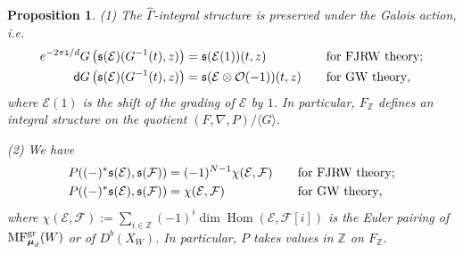 \documentclass[11pt]{amsart}
\newtheorem{pro}[thm]{Proposition} %
\theoremstyle{definition} %
\theoremstyle{remark} %
\newcommand{\ZZ}{\mathbb Z}
\newcommand{\Hom}{\operatorname{Hom}}
\def\MFhom{\operatorname{{MF}}}
\newcommand{\bmu}{\boldsymbol{\mu}}
\newcommand{\cO}{\mathcal{O}}
\newcommand{\cE}{\mathcal{E}}
\newcommand{\cF}{\mathcal{F}}
\newcommand{\frs}{\mathfrak{s}}
\newcommand{\dd}{\mathsf{d}}
\newcommand{\hGamma}{\widehat{\Gamma}}
\newcommand{\iu}{\mathtt{i}}
\begin{document}
\begin{pro} 
\label{pro:Gamma-intstr-properties}
{\rm (1)} The $\hGamma$-integral structure is preserved under 
the Galois action, i.e.\ 
\begin{alignat*}{2}
e^{-2\pi\iu/d} G \left( \frs(\cE)(G^{-1}(t),z) \right) 
& = \frs(\cE(1))(t,z)  
& & \text{\rm for FJRW theory}; \\ 
\dd G \left( \frs(\cE)(G^{-1}(t), z) \right) & = 
\frs(\cE\otimes \cO(-1))(t,z) \quad 
& & \text{\rm for GW theory},   
\end{alignat*} 
where $\cE(1)$ is the shift of the grading of $\cE$ by $1$. 
In particular, $F_\ZZ$ defines an integral structure 
on the quotient $(F,\nabla,P)/\langle G \rangle$. 

{\rm (2)} We have 
\begin{alignat*}{2} 
P((-)^*\frs(\cE), \frs(\cF)) & = (-1)^{N-1} \chi(\cE,\cF)  
& \quad & \text{\rm for FJRW theory;}\\ 
P((-)^*\frs(\cE),\frs(\cF)) & = \chi(\cE,\cF) 
& & \text{\rm for GW theory}, 
\end{alignat*} 
where $\chi(\cE,\cF) := \sum_{i\in \ZZ} (-1)^i 
\dim \Hom(\cE,\cF[i])$ is the Euler pairing of 
$\MFhom_{\bmu_d}^{\rm gr}(W)$ or of $D^b(X_W)$. 
In particular, $P$ takes values in $\ZZ$ on $F_\ZZ$. 
\end{pro}
\end{document}

